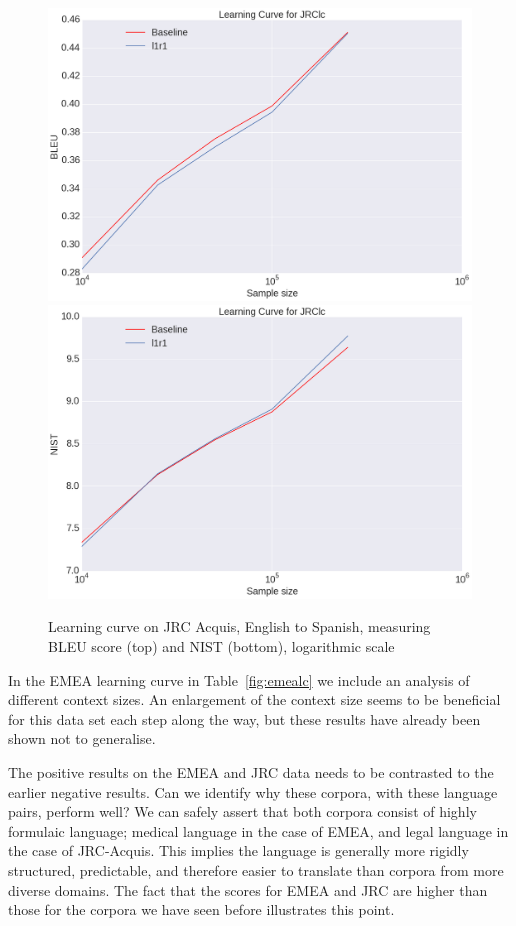 \documentclass[smallextended]{svjour3}       %
\theoremstyle{break}
\begin{document}
\begin{figure}
\includegraphics[width=120.00mm]{jrclcbleu.png}
\includegraphics[width=120.00mm]{jrclcnist.png}
\caption{Learning curve on JRC Acquis, English to Spanish, measuring BLEU score (top) and NIST (bottom), logarithmic scale}
\label{fig:jrclc}
\end{figure}


In the EMEA learning curve in Table~\ref{fig:emealc} we include an analysis
of different context sizes.  An enlargement of the context size seems to be
beneficial for this data set each step along the way, but these results have
already been shown not to generalise.

The positive results on the EMEA and JRC data needs to be
contrasted to the earlier negative results. Can we identify why these
corpora, with these language pairs, perform well? We can safely assert
that both corpora consist of highly formulaic language; medical language in the
case of EMEA, and legal language in the case of JRC-Acquis.  This
implies the language is generally more rigidly structured,
predictable, and therefore easier to translate than corpora from more
diverse domains. The fact that the scores for EMEA and JRC are higher
than those for the corpora we have seen before illustrates this
point.
\end{document}
